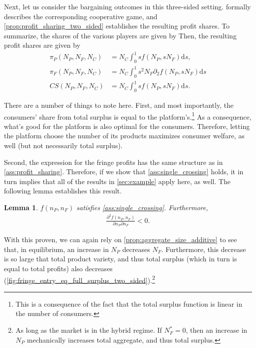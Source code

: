 \documentclass[a4paper]{article}
\newtheorem{lemma}{Lemma}
\newcommand{\ds}{\mathrm{d}s}
\begin{document}
Next, let us consider the bargaining outcomes in this three-sided setting.
 formally describes the corresponding cooperative game, and \cref{prop:profit_sharing_two_sided} establishes the resulting profit shares.
To summarize, the shares of the various players are given by
Then, the resulting profit shares are given by
\begin{align*}
    \pi_P(N_P, N_F, N_C) &= N_C \int_0^1 s f(N_P, s N_F) \ds, \\
    \pi_F(N_P, N_F, N_C) &= N_C \int_0^1 s^2 N_F \partial_2 f(N_P, s N_F) \ds \\
    CS(N_P, N_F, N_C) &= N_C \int_0^1 s f(N_P, s N_F) \ds.
\end{align*}

There are a number of things to note here.
First, and most importantly, the consumers' share from total surplus is equal to the platform's.\footnote{
    This is a consequence of the fact that the total surplus function is linear in the number of consumers.
}
As a consequence, what's good for the platform is also optimal for the consumers.
Therefore, letting the platform choose the number of its products maximizes consumer welfare, as well (but not necessarily total surplus).

Second, the expression for the fringe profits has the same structure as in \cref{ass:profit_sharing}.
Therefore, if we show that \cref{ass:single_crossing} holds, it in turn implies that all of the results in \cref{sec:example} apply here, as well.
The following lemma establishes this result.
\begin{lemma}
    \label{lem:profit_assumptions_two_sided}
    $f(n_P, n_F)$ satisfies \cref{ass:single_crossing}.
    Furthermore,
    \begin{align*}
        \frac{\partial^2 f(n_P, n_F)}{\partial n_P \partial n_F} < 0.
    \end{align*}
\end{lemma}

With this proven, we can again rely on \cref{prop:aggregate_size_additive} to see that, in equilibrium, an increase in $N_P$ decreases $N_F$.
Furthermore, this decrease is so large that total product variety, and thus total surplus (which in turn is equal to total profits) also decreases (\cref{fig:fringe_entry_eq_full_surplus_two_sided}).\footnote{
    As long as the market is in the hybrid regime.
    If $N_F^* = 0$, then an increase in $N_P$ mechanically increases total aggregate, and thus total surplus.
}
\end{document}
